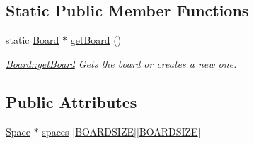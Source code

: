 \subsection*{Static Public Member Functions}
\begin{DoxyCompactItemize}
\item 
static \hyperlink{class_board}{Board} $\ast$ \hyperlink{class_board_ae30e802b1d83309fc95e695b5b3df338}{get\-Board} ()
\begin{DoxyCompactList}\small\item\em \hyperlink{class_board_ae30e802b1d83309fc95e695b5b3df338}{Board\-::get\-Board} Gets the board or creates a new one. \end{DoxyCompactList}\end{DoxyCompactItemize}
\subsection*{Public Attributes}
\begin{DoxyCompactItemize}
\item 
\hyperlink{class_space}{Space} $\ast$ \hyperlink{class_board_a73b12248ddb6ee3adc24f4458d8661c2}{spaces} \mbox{[}\hyperlink{board_8h_afb909c1a2193edc88c68390c025b2fa7}{B\-O\-A\-R\-D\-S\-I\-Z\-E}\mbox{]}\mbox{[}\hyperlink{board_8h_afb909c1a2193edc88c68390c025b2fa7}{B\-O\-A\-R\-D\-S\-I\-Z\-E}\mbox{]}
\end{DoxyCompactItemize}
